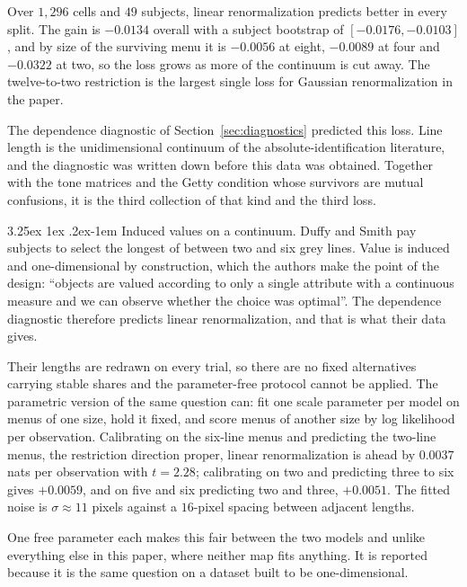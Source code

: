 \documentclass[11pt]{article}
\makeatletter
\theoremstyle{italichead}
\renewcommand\paragraph{\@startsection{paragraph}{4}{\z@}%
  {3.25ex \@plus1ex \@minus.2ex}{-1em}%
  {\normalfont\normalsize\itshape}}
\makeatother
\begin{document}
Over $1{,}296$ cells and $49$ subjects, linear renormalization predicts better in every split.
The gain is $-0.0134$ overall with a subject bootstrap of $[-0.0176, -0.0103]$, and by size of
the surviving menu it is $-0.0056$ at eight, $-0.0089$ at four and $-0.0322$ at two, so the
loss grows as more of the continuum is cut away. The twelve-to-two restriction is the largest
single loss for Gaussian renormalization in the paper.

The dependence diagnostic of Section~\ref{sec:diagnostics} predicted this loss. Line length is
the unidimensional continuum of the absolute-identification literature, and the diagnostic was
written down before this data was obtained. Together with the tone matrices and the Getty condition whose survivors
are mutual confusions, it is the third collection of that kind and the third loss.

\paragraph{Induced values on a continuum.} Duffy and Smith \cite{duffysmith2025} pay subjects
to select the longest of between two and six grey lines. Value is induced and one-dimensional by
construction, which the authors make the point of the design: ``objects are valued according to
only a single attribute with a continuous measure and we can observe whether the choice was
optimal''. The dependence diagnostic therefore predicts linear renormalization, and that is what their
data gives.

Their lengths are redrawn on every trial, so there are no fixed alternatives carrying stable
shares and the parameter-free protocol cannot be applied. The parametric version of the same
question can: fit one scale parameter per model on menus of one size, hold it fixed, and score
menus of another size by log likelihood per observation. Calibrating on the six-line menus and
predicting the two-line menus, the restriction direction proper, linear renormalization is ahead
by $0.0037$ nats per observation with $t = 2.28$; calibrating on two and predicting three to six
gives $+0.0059$, and on five and six predicting two and three, $+0.0051$. The fitted noise is
$\sigma \approx 11$ pixels against a $16$-pixel spacing between adjacent lengths.

One free parameter each makes this fair between the two models and unlike everything else in
this paper, where neither map fits anything. It is reported because it is the same question on a
dataset built to be one-dimensional.
\end{document}
